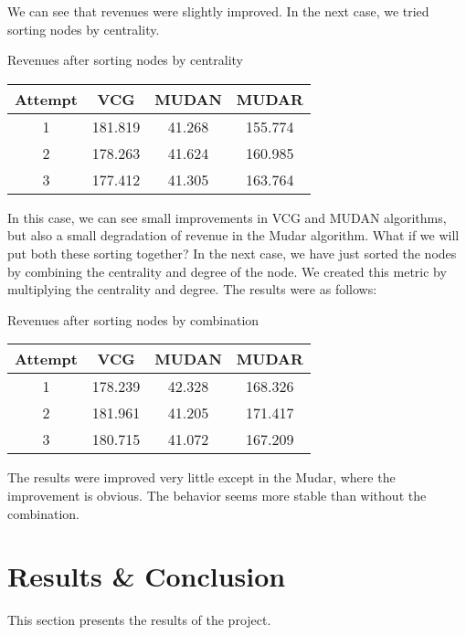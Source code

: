 \documentclass[conference]{IEEEtran}
\begin{document}
We can see that revenues were slightly improved. In the next case, we tried sorting nodes by centrality.

 \begin{center}
	Revenues after sorting nodes by centrality
	\vspace{10pt}
   \begin{tabular}{|c|c|c|c|}
        \hline
        Attempt & VCG & MUDAN & MUDAR \\
        \hline
        1 & 181.819 & 41.268 & 155.774 \\
        \hline
        2 & 178.263 & 41.624 & 160.985 \\
        \hline
        3 & 177.412 & 41.305 & 163.764 \\
        \hline
    \end{tabular}
\end{center}

In this case, we can see small improvements in VCG and MUDAN algorithms, but also a small degradation of revenue in the Mudar algorithm.
What if we will put both these sorting together? In the next case, we have just sorted the nodes by combining the centrality and degree of the node. We created this metric by multiplying the centrality and degree. The results were as follows:

 \begin{center}
	Revenues after sorting nodes by combination
	\vspace{10pt}
   \begin{tabular}{|c|c|c|c|}
        \hline
        Attempt & VCG & MUDAN & MUDAR \\
        \hline
        1 & 178.239 & 42.328 & 168.326 \\
        \hline
        2 & 181.961 & 41.205 & 171.417 \\
        \hline
        3 & 180.715 & 41.072 & 167.209 \\
        \hline
    \end{tabular}
\end{center}
	
The results were improved very little except in the Mudar, where the improvement is obvious. The behavior seems more stable than without the combination. 

\section{Results & Conclusion}
This section presents the results of the project.
\end{document}
